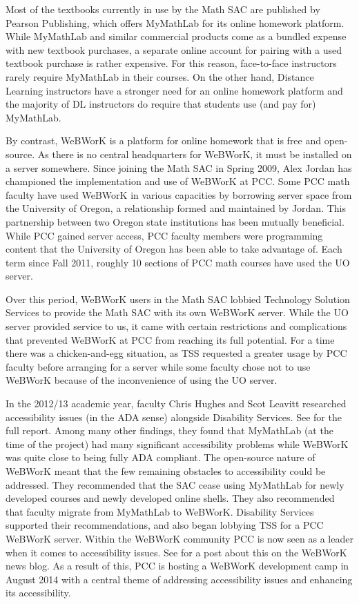 Most of the textbooks currently in use by the Math SAC are published by Pearson
Publishing, which offers MyMathLab for its online homework platform. While
MyMathLab and similar commercial products come as a bundled expense with new
textbook purchases, a separate online account for pairing with a used textbook
purchase is rather expensive. For this reason, face-to-face instructors rarely
require MyMathLab in their courses. On the other hand, Distance Learning
instructors have a stronger need for an online homework platform and the
majority of DL instructors do require that students use (and pay for) MyMathLab.

By contrast, WeBWorK is a platform for online homework that is free and
open-source. As there is no central headquarters for WeBWorK, it must be
installed on a server somewhere. Since joining the Math SAC in Spring 2009,
Alex Jordan has championed the implementation and use of WeBWorK at PCC. Some
PCC math faculty have used WeBWorK in various capacities by borrowing server
space from the University of Oregon, a relationship formed and maintained by
Jordan. This partnership between two Oregon state institutions has been
mutually beneficial. While PCC gained server access, PCC faculty members were
programming content that the University of Oregon has been able to take advantage of. Each term since
Fall 2011, roughly 10 sections of PCC math courses have used the UO server.

Over this period, WeBWorK users in the Math SAC lobbied Technology Solution
Services to provide the Math SAC with its own WeBWorK server. While the UO
server provided service to us, it came with certain restrictions and
complications that prevented WeBWorK at PCC from reaching its full potential.
For a time there was a chicken-and-egg situation, as TSS requested a greater
usage by PCC faculty before arranging for a server while some faculty chose not
to use WeBWorK because of the inconvenience of using the UO server.

In the 2012/13 academic year, faculty Chris Hughes and Scot Leavitt researched
accessibility issues (in the ADA sense) alongside Disability Services. See
\cite{accessibilityproject} for the full report. Among many other findings, they
found that MyMathLab (at the time of the project) had many significant
accessibility problems while WeBWorK was quite close to being fully ADA
compliant. The open-source nature of WeBWorK meant that the few remaining
obstacles to accessibility could be addressed. They recommended that the SAC
cease using MyMathLab for newly developed courses and newly developed online
shells. They also recommended that faculty migrate from MyMathLab to WeBWorK.
Disability Services supported their recommendations, and also began lobbying TSS
for a PCC WeBWorK server. Within the WeBWorK community PCC is now seen as a
leader when it comes to accessibility issues. See \cite{webworkblog} for a post
about this on the WeBWorK news blog. As a result of this, PCC is hosting a
WeBWorK development camp in August 2014 with a central theme of addressing
accessibility issues and enhancing its accessibility.\label{other:page:disabilityservices}

